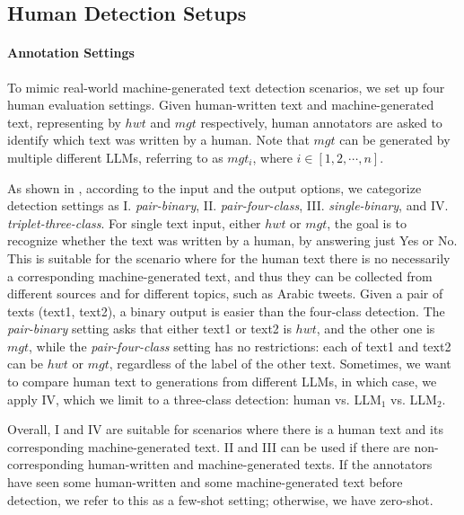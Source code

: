 

\subsection{Human Detection Setups}
\label{sec:anno-setup}

\paragraph{Annotation Settings}
To mimic real-world machine-generated text detection scenarios, we set up four human evaluation settings.
Given human-written text and machine-generated text, representing by $hwt$ and $mgt$ respectively, human annotators are asked to identify which text was written by a human. Note that $mgt$ can be generated by multiple different LLMs, referring to as $mgt_i$, where $i \in [1,2, \cdots, n]$.

As shown in , according to the input and the output options, we categorize detection settings as I. \emph{pair-binary}, II. \emph{pair-four-class}, III. \emph{single-binary}, and IV. \emph{triplet-three-class}. 
For single text input, either $hwt$ or $mgt$, the goal is to recognize whether the text was written by a human, by answering just Yes or No. This is suitable for the scenario where for the human text there is no necessarily a corresponding machine-generated text, and thus they can be collected from different sources and for different topics, such as Arabic tweets.
Given a pair of texts (text1, text2), a binary output is easier than the four-class detection. The \emph{pair-binary} setting asks that either text1 or text2 is $hwt$, and the other one is $mgt$, while the \emph{pair-four-class} setting has no restrictions: each of text1 and text2 can be $hwt$ or $mgt$, regardless of the label of the other text. 
Sometimes, we want to compare human text to generations from different LLMs, in which case, we apply IV, which we limit to a three-class detection: human vs. LLM$_1$ vs. LLM$_2$.

Overall, I and IV are suitable for scenarios where there is a human text and its corresponding machine-generated text. II and III can be used if there are non-corresponding human-written and machine-generated texts.
If the annotators have seen some human-written and some machine-generated text before detection, we refer to this as a few-shot setting; otherwise, we have zero-shot.


